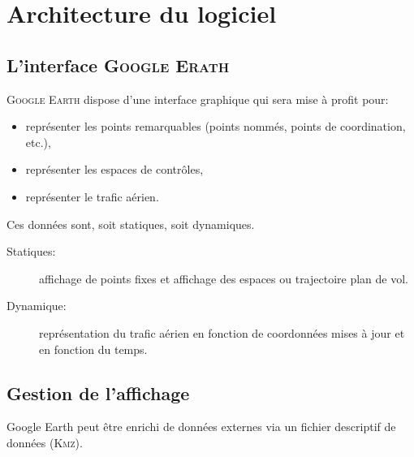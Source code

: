 


\section{Architecture du logiciel}
    \subsection{L'interface \textsc{Google Erath}}
\textsc{Google Earth} dispose d’une interface graphique qui sera mise à profit pour:
\begin{itemize}
\item représenter les points remarquables (points nommés, points de coordination, etc.),
\item représenter les espaces de contrôles,
\item représenter le trafic aérien.
\end{itemize}\medskip

Ces données sont, soit statiques, soit dynamiques.
\begin{description}
\item[Statiques:] affichage de points fixes et affichage des espaces ou trajectoire plan de vol. 
\item[Dynamique:] représentation du trafic aérien en fonction de coordonnées mises à jour et en fonction du temps.
\end{description}\medskip

    \subsection{Gestion de l'affichage}
Google Earth peut être enrichi de données externes via un fichier descriptif de données (\textsc{Kmz}).

